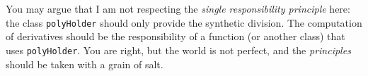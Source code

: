 \documentclass[10pt,a4paper]{article}
\theoremstyle{definition}%
\begin{document}
You may argue that I am not respecting the \emph{single responsibility principle} here: the class \texttt{polyHolder} should only provide the synthetic division. The computation of derivatives should be the responsibility of a function (or another class) that uses \texttt{polyHolder}. You are right, but the world is not perfect, and the \emph{principles} should be taken with a grain of salt.
\end{document}
